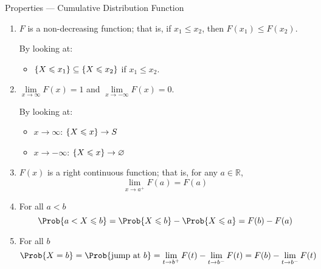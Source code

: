 \begin{Definition}{Properties --- Cumulative Distribution Function}{}
    \begin{enumerate}[label=(\arabic*)]
        \item $ F $ is a non-decreasing function; that is, if $ x_1\leqslant x_2 $,
              then $ F(x_1)\leqslant F(x_2) $.

              By looking at:
              \begin{itemize}
                  \item $ \{X\leqslant x_1\}\subseteq \{X\leqslant x_2\} $
                        if $ x_1\leqslant x_2 $.
              \end{itemize}
        \item $ \lim\limits_{{x} \to {\infty}} F(x)=1 $
              and $ \lim\limits_{{x} \to {-\infty}} F(x)=0 $.

              By looking at:
              \begin{itemize}
                  \item $ x\to\infty $: $ \{X\leqslant x\}\to S $
                  \item $ x\to-\infty $: $ \{X\leqslant x\}\to \varnothing $
              \end{itemize}
        \item $ F(x) $ is a right continuous function; that is,
              for any $ a\in\mathbb{R} $,
              \[ \lim\limits_{{x} \to {a^+}} F(a)=F(a) \]
        \item For all $ a<b $
              \[ \Prob{a<X\leqslant b}=\Prob{X\leqslant b}-\Prob{X\leqslant a}=F(b)-F(a) \]
        \item For all $ b $
              \[ \Prob{X=b}=\Prob{\text{jump at }b}=\lim\limits_{{t} \to {b^+}} F(t)-
                  \lim\limits_{{t} \to {b^-}} F(t)=F(b)-\lim\limits_{{t} \to {b^-}} F(t) \]
    \end{enumerate}
\end{Definition}
